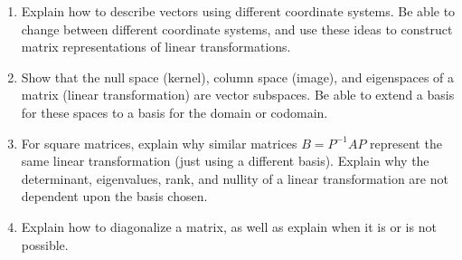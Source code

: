 
\begin{enumerate}
\item Explain how to describe vectors using different coordinate systems. Be able to change between different coordinate systems, and use these ideas to construct matrix representations of linear transformations.
\item Show that the null space (kernel), column space (image), and eigenspaces of a matrix (linear transformation) are vector subspaces. Be able to extend a basis for these spaces to a basis for the domain or codomain.
\item For square matrices, explain why similar matrices $B=P^{-1}AP$ represent the same linear transformation (just using a different basis). Explain why the determinant, eigenvalues, rank, and nullity of a linear transformation are not dependent upon the basis chosen.
\item Explain how to diagonalize a matrix, as well as explain when it is or is not possible. 
\end{enumerate}
